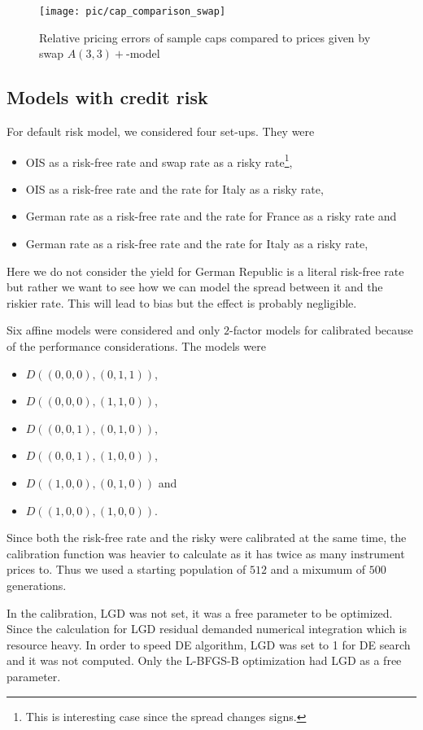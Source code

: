 \begin{figure}[H]
	\centering
	\texttt{[image: pic/cap\_comparison\_swap]}
	\caption{Relative pricing errors of sample caps compared to prices given by swap
		 $A(3,3)+$-model}
	\label{fig:cap_comparison_swap}
\end{figure}

\subsection{Models with credit risk}

For default risk model, we considered four set-ups. They were
	\begin{itemize}
		\item OIS as a risk-free rate and swap rate as a risky rate\footnote{This is interesting case since the spread changes signs.},
		\item OIS as a risk-free rate and the rate for Italy as a risky rate,
		\item German rate as a risk-free rate and the rate for France as a risky rate and
		\item German rate as a risk-free rate and the rate for Italy as a risky rate,
	\end{itemize}
Here we do not consider the yield for German Republic is a literal risk-free rate but rather we want to see how we can model the spread between it and the riskier rate. This will lead to bias but the effect is probably negligible.

Six affine models were considered and only $2$-factor models for calibrated because of the performance considerations. The models were
	\begin{itemize}
	\item $D((0, 0, 0), (0,1,1))$, 
	\item $D((0, 0, 0), (1,1,0))$,
	\item $D((0, 0, 1), (0,1,0))$,
	\item $D((0, 0, 1), (1,0,0))$,
	\item $D((1, 0, 0), (0,1,0))$ and 
	\item $D((1, 0, 0), (1,0,0))$.
\end{itemize}

Since both the risk-free rate and the risky were calibrated at the same time, the calibration function was heavier to calculate as it has twice as many instrument prices to. Thus we used a starting population of $512$ and a mixumum of $500$ generations.

In the calibration, LGD was not set, it was a free parameter to be optimized. Since the calculation for LGD residual demanded numerical integration which is resource heavy. In order to speed DE algorithm, LGD was set to 1 for DE search and it was not computed. Only the L-BFGS-B optimization had LGD as a free parameter.

